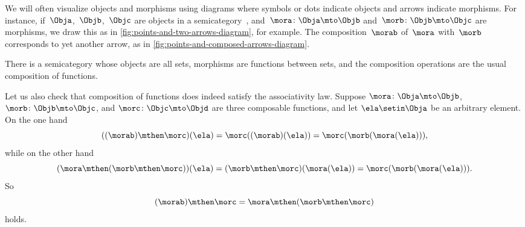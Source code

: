 \begin{remark}
    We will often visualize objects and morphisms using diagrams where symbols or dots indicate objects and arrows indicate morphisms.
    For instance, if~$\Obja$,~$\Objb$,~$\Objc$ are objects in a semicategory~\CatC, and~$\mora\colon \Obja \mto \Objb$ and~$\morb\colon \Objb \mto \Objc$ are morphisms, we draw this as in \cref{fig:points-and-two-arrows-diagram}, for example.
    The composition~$\morab$ of~$\mora$ with~$\morb$ corresponds to yet another arrow, as in \cref{fig:points-and-composed-arrows-diagram}.
\end{remark}

\begin{example}
    \label{exa:the-semicategory-of-sets}
    There is a semicategory whose objects are all sets, morphisms are functions between sets, and the composition operations are the usual composition of functions.

    Let us also check that composition of functions does indeed satisfy the associativity law.
    Suppose $\mora \colon \Obja \mto \Objb$, $\morb\colon \Objb \mto \Objc$, and $\morc \colon \Objc \mto \Objd$ are three composable functions, and let $\ela \setin \Obja$ be an arbitrary element.
    On the one hand
    \begin{equation}\label{eq:function-associativity-1}
        ((\morab) \mthen \morc)(\ela) = \morc((\morab)(\ela)) = \morc (\morb (\mora (\ela))),
    \end{equation}
    while on the other hand
    \begin{equation}\label{eq:function-associativity-2}
        (\mora \mthen (\morb \mthen \morc))(\ela)
        = (\morb \mthen \morc)(\mora(\ela)) = \morc (\morb (\mora (\ela))).
    \end{equation}
    So
    \begin{equation}\label{eq:function-associativity-3}
        (\morab)
        \mthen \morc = \mora \mthen (\morb \mthen \morc)
    \end{equation}
    holds.
\end{example}


